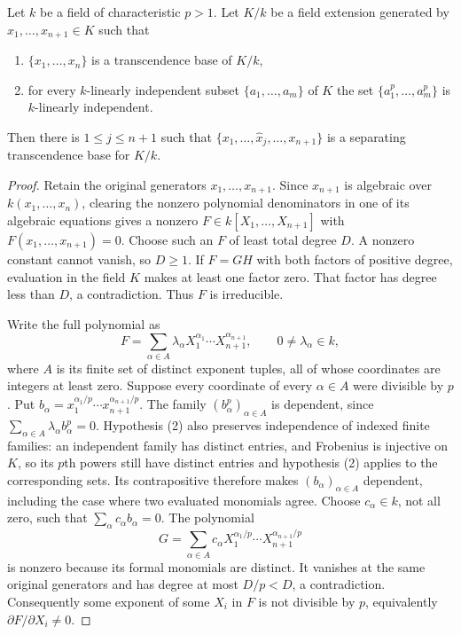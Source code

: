 \begin{lemma}
\label{lemma-mini-separability}
Let $k$ be a field of characteristic $p > 1$. Let $K/k$
be a field extension generated by $x_1, \ldots, x_{n + 1} \in K$ such that
\begin{enumerate}
\item $\{x_1, \ldots, x_n\}$ is a transcendence base of $K/k$,
\item for every $k$-linearly independent subset
$\{a_1, \ldots, a_m\}$ of $K$ the set
$\{a^p_1, \ldots, a_m^p\}$ is $k$-linearly independent.
\end{enumerate}
Then there is $1 \leq j \leq n+1$ such that
$\{ x_1, \ldots, \widehat{x}_j, \ldots, x_{n+1}\}$
is a separating transcendence base for $K / k$.
\end{lemma}

\begin{proof}
Retain the original generators $x_1,\ldots,x_{n+1}$.
Since $x_{n+1}$ is algebraic over $k(x_1,\ldots,x_n)$,
clearing the nonzero polynomial denominators in one of its
algebraic equations gives a nonzero
$F\in k[X_1,\ldots,X_{n+1}]$ with $F(x_1,\ldots,x_{n+1})=0$.
Choose such an $F$ of least total degree $D$. A nonzero
constant cannot vanish, so $D\geq1$. If $F=GH$ with both
factors of positive degree, evaluation in the field $K$
makes at least one factor zero. That factor has degree
less than $D$, a contradiction. Thus $F$ is irreducible.

Write the full polynomial as
$$
F=\sum_{\alpha\in A}\lambda_\alpha
X_1^{\alpha_1}\cdots X_{n+1}^{\alpha_{n+1}},
\qquad 0\neq\lambda_\alpha\in k,
$$
where $A$ is its finite set of distinct exponent tuples,
all of whose coordinates are integers at least zero.
Suppose every coordinate of every $\alpha\in A$ were
divisible by $p$. Put
$b_\alpha=x_1^{\alpha_1/p}\cdots x_{n+1}^{\alpha_{n+1}/p}$.
The family $(b_\alpha^p)_{\alpha\in A}$ is dependent,
since $\sum_{\alpha\in A}\lambda_\alpha b_\alpha^p=0$.
Hypothesis (2) also preserves independence of indexed
finite families: an independent family has distinct
entries, and Frobenius is injective on $K$, so its
$p$th powers still have distinct entries and hypothesis
(2) applies to the corresponding sets. Its contrapositive
therefore makes $(b_\alpha)_{\alpha\in A}$ dependent,
including the case where two evaluated monomials agree.
Choose $c_\alpha\in k$, not all zero, such that
$\sum_\alpha c_\alpha b_\alpha=0$. The polynomial
$$
G=\sum_{\alpha\in A}c_\alpha
X_1^{\alpha_1/p}\cdots X_{n+1}^{\alpha_{n+1}/p}
$$
is nonzero because its formal monomials are distinct.
It vanishes at the same original generators and has
degree at most $D/p<D$, a contradiction. Consequently
some exponent of some $X_i$ in $F$ is not divisible
by $p$, equivalently $\partial F/\partial X_i\neq0$.


\end{proof}
